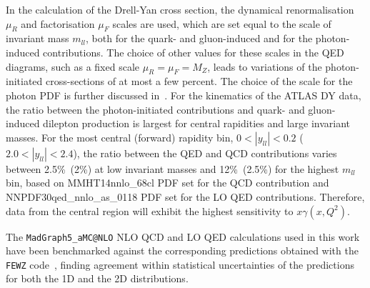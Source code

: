 In the  calculation of the Drell-Yan cross section, the
dynamical renormalisation $\mu_{R}$ and factorisation $\mu_{F}$
scales are used, which are set equal to the scale of invariant mass $m_{ll}$,
both for the quark- and gluon-induced and for the photon-induced
contributions.
%
The choice of other values for these scales in the QED diagrams,
such as a fixed scale $\mu_R=\mu_F=M_Z$, leads 
to  variations of the photon-initiated cross-sections of at most a few percent.
%
The choice of the scale for the photon PDF  is further discussed
in~\cite{Harland-Lang:2016lhw,Dittmaier:2009cr}.
%
For the kinematics of the ATLAS DY data, the ratio between the photon-initiated
contributions and  quark- and gluon-induced dilepton production is largest
for central rapidities and large invariant masses. 
%
For the most central (forward) rapidity
bin, $0 < |y_{ll}| < 0.2$ ($2.0 < |y_{ll}| < 2.4$), the ratio
between the QED and QCD contributions varies between 2.5\%~(2\%) at low
invariant masses and 12\%~(2.5\%) for the highest $m_{ll}$ bin, based on 
MMHT14nnlo\_68cl PDF set for the QCD contribution and NNPDF30qed\_nnlo\_as\_0118
PDF set for the LO QED contributions.
%
Therefore, data from the central region will exhibit the highest
sensitivity to $x\gamma(x,Q^2)$.

The {\tt MadGraph5{\_}aMC@NLO} NLO QCD and LO QED calculations used in this work have been
benchmarked against the corresponding predictions  obtained with the {\tt FEWZ}
code~\cite{Gavin:2012sy}, finding agreement within statistical uncertainties of
the predictions for both the 1D and the 2D distributions.

